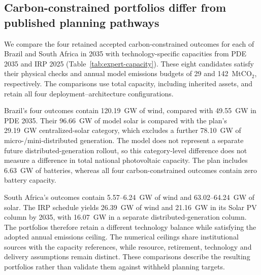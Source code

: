\documentclass[pdflatex,sn-nature]{sn-jnl}
\begin{document}
\subsection{Carbon-constrained portfolios differ from published planning pathways}\label{sec:expert-comparison}

We compare the four retained accepted carbon-constrained outcomes for each of Brazil and South Africa in 2035 with technology-specific capacities from PDE 2035 and IRP 2025 (Table~\ref{tab:expert-capacity}). These eight candidates satisfy their physical checks and annual model emissions budgets of 29 and 142~MtCO$_2$, respectively. The comparisons use total capacity, including inherited assets, and retain all four deployment--architecture configurations.

Brazil's four outcomes contain 120.19~GW of wind, compared with 49.55~GW in PDE 2035. Their 96.66~GW of model solar is compared with the plan's 29.19~GW centralized-solar category, which excludes a further 78.10~GW of micro-/mini-distributed generation. The model does not represent a separate future distributed-generation rollout, so this category-level difference does not measure a difference in total national photovoltaic capacity. The plan includes 6.63~GW of batteries, whereas all four carbon-constrained outcomes contain zero battery capacity.

South Africa's outcomes contain 5.57--6.24~GW of wind and 63.02--64.24~GW of solar. The IRP schedule yields 26.39~GW of wind and 21.16~GW in its Solar PV column by 2035, with 16.07~GW in a separate distributed-generation column. The portfolios therefore retain a different technology balance while satisfying the adopted annual emissions ceiling. The numerical ceilings share institutional sources with the capacity references, while resource, retirement, technology and delivery assumptions remain distinct. These comparisons describe the resulting portfolios rather than validate them against withheld planning targets.
\end{document}
